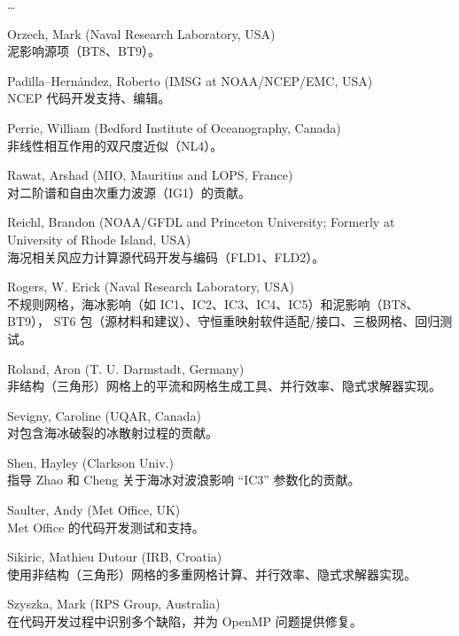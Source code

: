\begin{list}{\ldots}{ }
\item [Orzech, Mark]  (Naval Research Laboratory, USA)\\
  泥影响源项（BT8、BT9）。

\item [Padilla--Hern\'andez, Roberto]  (IMSG at NOAA/NCEP/EMC, USA)\\
  NCEP 代码开发支持、编辑。

\item [Perrie, William] (Bedford Institute of Oceanography, Canada)\\
  非线性相互作用的双尺度近似（NL4）。

\item [Rawat, Arshad] (MIO, Mauritius and LOPS, France) \\
  对二阶谱和自由次重力波源（IG1）的贡献。

\item [Reichl, Brandon] (NOAA/GFDL and Princeton University; Formerly at University of Rhode Island, USA) \\
  海况相关风应力计算源代码开发与编码（FLD1、FLD2）。

\item [Rogers, W. Erick]  (Naval Research Laboratory, USA)\\
  不规则网格，海冰影响（如 IC1、IC2、IC3、IC4、IC5）和泥影响（BT8、BT9），
  ST6 包（源材料和建议）、守恒重映射软件适配/接口、三极网格、回归测试。

\item [Roland, Aron] (T. U. Darmstadt, Germany) \\
  非结构（三角形）网格上的平流和网格生成工具、并行效率、隐式求解器实现。

\item [Sevigny, Caroline] (UQAR, Canada) \\
  对包含海冰破裂的冰散射过程的贡献。

\item [Shen, Hayley] (Clarkson Univ.) \\
  指导 Zhao 和 Cheng 关于海冰对波浪影响 ``IC3'' 参数化的贡献。

\item [Saulter, Andy] (Met Office, UK)\\
  Met Office 的代码开发测试和支持。

\item [Sikiric, Mathieu Dutour] (IRB, Croatia) \\
  使用非结构（三角形）网格的多重网格计算、并行效率、隐式求解器实现。

\item [Szyszka, Mark] (RPS Group, Australia) \\
  在代码开发过程中识别多个缺陷，并为 OpenMP 问题提供修复。


\end{list}
